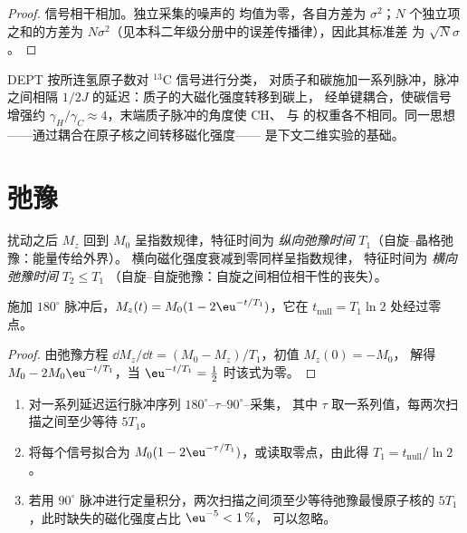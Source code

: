 \begin{proof}
信号相干相加。独立采集的噪声的
均值为零，各自方差为 $\sigma^2$；$N$ 个独立项之和的方差为
$N\sigma^2$（见本科二年级分册中的误差传播律），因此其标准差
为 $\sqrt N\sigma$。
\end{proof}

DEPT 按所连氢原子数对 ${}^{13}$C 信号进行分类，
对质子和碳施加一系列脉冲，脉冲之间相隔
$1/2J$ 的延迟：质子的大磁化强度转移到碳上，
经单键耦合，使碳信号增强约
$\gamma_H/\gamma_C \approx 4$，末端质子脉冲的角度使 CH、 与
 的权重各不相同。同一思想——通过耦合在原子核之间转移磁化强度——
是下文二维实验的基础。

\section{弛豫}

\begin{definition}[纵向与横向弛豫时间]\label{def:b3:advanced-nmr:relaxation}
扰动之后 $M_z$ 回到 $M_0$ 呈指数规律，特征时间为
\emph{纵向弛豫时间} $T_1$（自旋–晶格弛豫：能量传给外界）。
横向磁化强度衰减到零同样呈指数规律，
特征时间为
\emph{横向弛豫时间} $T_2 \le T_1$
（自旋–自旋弛豫：自旋之间相位相干性的丧失）。
\end{definition}

\begin{proposition}[反转恢复]\label{prop:b3:advanced-nmr:inversion-recovery}
施加 $180^\circ$ 脉冲后，$M_z(t) = M_0(1 - 2\eu^{-t/T_1})$，它在
$t_{\mathrm{null}} = T_1\ln2$ 处经过零点。
\end{proposition}

\begin{proof}
由弛豫方程 $\dd M_z/\dd t = (M_0 - M_z)/T_1$，初值 $M_z(0) = -M_0$，
解得 $M_0 - 2M_0\eu^{-t/T_1}$，当 $\eu^{-t/T_1} = \frac12$ 时该式为零。
\end{proof}

\begin{method}[测量 $T_1$ 并设定定量循环延迟]\label{met:b3:advanced-nmr:t1}
\begin{enumerate}
  \item 对一系列延迟运行脉冲序列 $180^\circ$--$\tau$--$90^\circ$--采集，
        其中 $\tau$ 取一系列值，每两次扫描之间至少等待 $5T_1$。
  \item 将每个信号拟合为 $M_0(1 - 2\eu^{-\tau/T_1})$，或读取零点，由此得 $T_1 =
        t_{\mathrm{null}}/\ln2$。
  \item 若用 $90^\circ$ 脉冲进行定量积分，两次扫描之间须至少等待弛豫最慢原子核的
        $5T_1$，此时缺失的磁化强度占比 $\eu^{-5} < 1\,\%$，
        可以忽略。
\end{enumerate}
\end{method}

